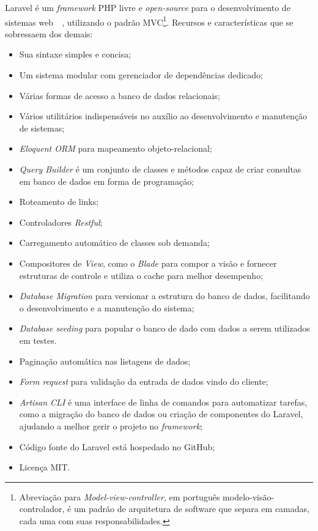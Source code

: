 \documentclass[
  12pt,            %
  openany,
  oneside,
  a4paper,         %
  english,      %
  brazil
]{article}
\numberwithin{figure}{section}
\numberwithin{table}{section}
\newcounter{subsubsubsection}[subsubsection]
\begin{document}
Laravel é um \textit{framework} PHP livre e \textit{open-source} para o desenvolvimento de sistemas web~\cite{laravel5}~\cite{laravel_kiliccdaugi}, utilizando o padrão MVC\footnote{Abreviação para \textit{Model-view-controller}, em português modelo-visão-controlador, é um padrão de arquitetura de software que separa em camadas, cada uma com suas responsabilidades.}. Recursos e características que se sobressaem dos demais:

{\singlespacing
\begin{itemize}
  \item Sua sintaxe simples e concisa;
  \item Um sistema modular com gerenciador de dependências dedicado;
  \item Várias formas de acesso a banco de dados relacionais;
  \item Vários utilitários indispensáveis no auxílio ao desenvolvimento e manutenção de sistemas;
  \item \textit{Eloquent ORM} para mapeamento objeto-relacional;
  \item \textit{Query Builder} é um conjunto de classes e métodos capaz de criar consultas em banco de dados em forma de programação;
  \item Roteamento de links;
  \item Controladores \textit{Restful};
  \item Carregamento automático de classes sob demanda;
  \item Compositores de \textit{View}, como o \textit{Blade} para compor a visão e fornecer estruturas de controle e utiliza o cache para melhor desempenho;
  \item \textit{Database Migration} para versionar a estrutura do banco de dados, facilitando o desenvolvimento e a manutenção do sistema;
  \item \textit{Database seeding} para popular o banco de dado com dados a serem utilizados em testes.
  \item Paginação automática nas listagens de dados;
  \item \textit{Form request} para validação da entrada de dados vindo do cliente;
  \item \textit{Artisan CLI} é uma interface de linha de comandos para automatizar tarefas, como a migração do banco de dados ou criação de componentes do Laravel, ajudando a melhor gerir o projeto no \textit{framework};
  \item Código fonte do Laravel está hospedado no GitHub;
  \item Licença MIT.
\end{itemize}
}
\end{document}
